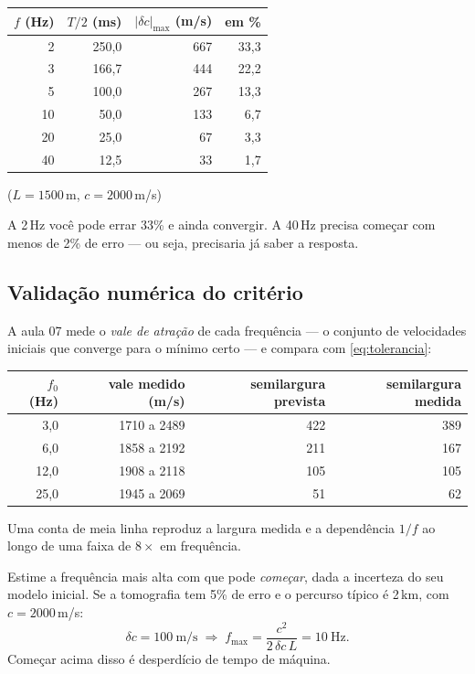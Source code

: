 \documentclass[11pt,a4paper,oneside]{report}
\begin{document}
\begin{center}
\begin{tabular}{@{}rrrr@{}}
\toprule
$f$ (Hz) & $T/2$ (ms) & $|\delta c|_{\max}$ (m/s) & em \% \\
\midrule
2  & 250{,}0 & 667 & 33{,}3 \\
3  & 166{,}7 & 444 & 22{,}2 \\
5  & 100{,}0 & 267 & 13{,}3 \\
10 & 50{,}0  & 133 & 6{,}7 \\
20 & 25{,}0  & 67  & 3{,}3 \\
40 & 12{,}5  & 33  & 1{,}7 \\
\bottomrule
\end{tabular}
\end{center}
{\small ($L = 1500$\,m, $c = 2000$\,m/s)}

A 2\,Hz você pode errar 33\% e ainda convergir. A 40\,Hz precisa começar com
menos de 2\% de erro --- ou seja, precisaria já saber a resposta.

\subsection*{Validação numérica do critério}

A aula 07 mede o \emph{vale de atração} de cada frequência --- o conjunto de
velocidades iniciais que converge para o mínimo certo --- e compara com
\eqref{eq:tolerancia}:

\begin{center}
\begin{tabular}{@{}rrrr@{}}
\toprule
$f_0$ (Hz) & vale medido (m/s) & semilargura prevista & semilargura medida \\
\midrule
3{,}0  & 1710 a 2489 & 422 & 389 \\
6{,}0  & 1858 a 2192 & 211 & 167 \\
12{,}0 & 1908 a 2118 & 105 & 105 \\
25{,}0 & 1945 a 2069 & 51  & 62 \\
\bottomrule
\end{tabular}
\end{center}

Uma conta de meia linha reproduz a largura medida e a dependência $1/f$ ao
longo de uma faixa de $8\times$ em frequência.

\begin{pratica}
Estime a frequência mais alta com que pode \emph{começar}, dada a incerteza
do seu modelo inicial. Se a tomografia tem 5\% de erro e o percurso típico é
2\,km, com $c = 2000$\,m/s:
\[
\delta c = 100\ \text{m/s} \;\Rightarrow\;
f_{\max} = \frac{c^{2}}{2\,\delta c\,L} = 10\ \text{Hz}.
\]
Começar acima disso é desperdício de tempo de máquina.
\end{pratica}
\end{document}
